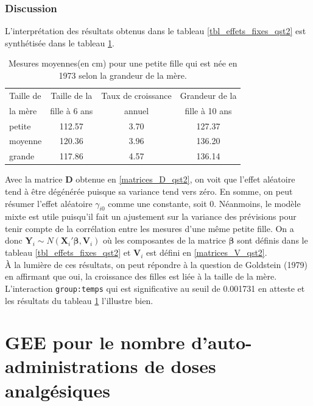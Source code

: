 \documentclass{article}
\begin{document}
	\subsubsection*{Discussion}
		L'interprétation des résultats obtenus dans le tableau \ref{tbl_effets_fixes_qst2} est synthétisée dans le tableau \ref{tbl_interpretation_qst2}.
		\begin{table}[H]
			\centering
			\begin{tabular}{lccc}
				\hline
				Taille de  & Taille de la  & Taux de croissance  &  Grandeur de la \\
				la mère & fille à 6 ans & annuel &  fille à 10 ans \\
				\hline
				petite & 112.57 & 3.70 & 127.37 \\
				moyenne & 120.36 & 3.96 & 136.20 \\
				grande & 117.86 & 4.57 & 136.14 \\
				\hline
			\end{tabular}
			\caption{Mesures moyennes(en cm) pour une petite fille qui est née en 1973 selon la grandeur de la mère.}
			\label{tbl_interpretation_qst2}
		\end{table}
		Avec la matrice $\boldsymbol{D}$ obtenue en \eqref{matrices_D_qst2}, on voit que l'effet aléatoire tend à être dégénérée puisque sa variance tend vers zéro. En somme, on peut résumer l'effet aléatoire $\gamma_{i0}$ comme une constante, soit 0. Néanmoins, le modèle mixte est utile puisqu'il fait un ajustement sur la variance des prévisions pour tenir compte de la corrélation entre les mesures d'une même petite fille.
		On a donc $\boldsymbol{Y}_{i} \sim N(\boldsymbol{X}_{i}'\boldsymbol{\beta}, \boldsymbol{V}_i)$ où les composantes de la matrice $\boldsymbol{\beta}$ sont définis dans le tableau \ref{tbl_effets_fixes_qst2} et $\boldsymbol{V}_i$ est défini en \eqref{matrices_V_qst2}.\\
		
		À la lumière de ces résultats, on peut répondre à la question de Goldstein (1979) en affirmant que oui, la croissance des filles est liée à la taille de la mère.
		L'interaction \texttt{group:temps} qui est significative au seuil de 0.001731 en atteste et les résultats du tableau \ref{tbl_interpretation_qst2} l'illustre bien.
		

\section{GEE pour le nombre d'auto-administrations de doses analgésiques}
	
\end{document}
